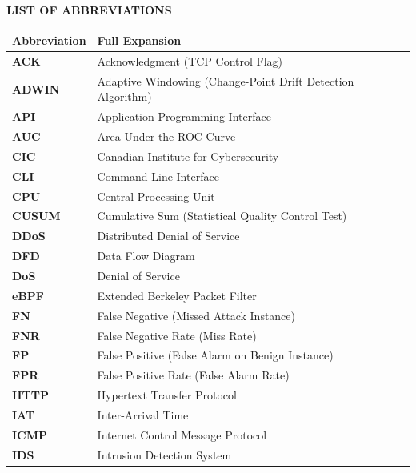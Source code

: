 \documentclass[12pt,a4paper,oneside]{report}
\begin{document}
\newpage
\tableofcontents
\newpage
\listoffigures
\newpage
\listoftables

\newpage
\thispagestyle{plain}
\begin{center}
{\LARGE \textbf{LIST OF ABBREVIATIONS}}\\[1.0cm]
\end{center}

\begin{table}[h]
\centering
\begin{tabularx}{\textwidth}{l X}
\toprule
\textbf{Abbreviation} & \textbf{Full Expansion} \\
\midrule
\textbf{ACK}       & Acknowledgment (TCP Control Flag) \\
\textbf{ADWIN}     & Adaptive Windowing (Change-Point Drift Detection Algorithm) \\
\textbf{API}       & Application Programming Interface \\
\textbf{AUC}       & Area Under the ROC Curve \\
\textbf{CIC}       & Canadian Institute for Cybersecurity \\
\textbf{CLI}       & Command-Line Interface \\
\textbf{CPU}       & Central Processing Unit \\
\textbf{CUSUM}     & Cumulative Sum (Statistical Quality Control Test) \\
\textbf{DDoS}      & Distributed Denial of Service \\
\textbf{DFD}       & Data Flow Diagram \\
\textbf{DoS}       & Denial of Service \\
\textbf{eBPF}      & Extended Berkeley Packet Filter \\
\textbf{FN}        & False Negative (Missed Attack Instance) \\
\textbf{FNR}       & False Negative Rate (Miss Rate) \\
\textbf{FP}        & False Positive (False Alarm on Benign Instance) \\
\textbf{FPR}       & False Positive Rate (False Alarm Rate) \\
\textbf{HTTP}      & Hypertext Transfer Protocol \\
\textbf{IAT}       & Inter-Arrival Time \\
\textbf{ICMP}      & Internet Control Message Protocol \\
\textbf{IDS}       & Intrusion Detection System \\

\end{tabularx}
\end{table}
\end{document}
